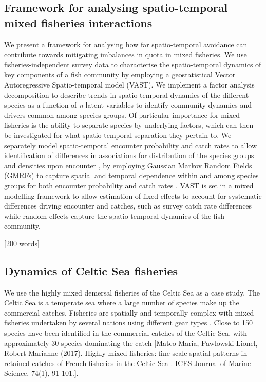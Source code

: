 \documentclass{nature}
\begin{document}
\begin{linenumbers}
[580 words]

\subsection{Framework for analysing spatio-temporal mixed fisheries
	interactions}

We present a framework for analysing how far spatio-temporal avoidance can contribute
towards mitigating imbalances in quota in mixed fisheries. We use fisheries-independent survey data to characterise the spatio-temporal dynamics of key
components of a fish community by employing a geostatistical Vector
Autoregressive Spatio-temporal model (VAST). We implement a factor analysis
decomposition to describe trends in spatio-temporal dynamics of the different
species as a function of \textit{n} latent variables \cite{Thorson2015} to
identify community dynamics and drivers common among species groups. Of particular importance for mixed fisheries is the ability to separate species by underlying factors, which can then be investigated for what spatio-temporal separation they pertain to. We separately model spatio-temporal encounter probability and catch rates to allow
identification of differences in associations for distribution of the species
groups and densities upon encounter \cite{Thorson2015a}, by employing 
Gaussian Markov Random Fields (GMRFs) to capture spatial and temporal
dependence within and among species groups for both encounter probability and
catch rates \cite{Thorson2013}. VAST is set in a mixed modelling framework
to allow estimation of fixed effects to account for systematic differences
driving encounter and catches, such as survey catch rate differences while
random effects capture the spatio-temporal dynamics of the fish community.

[200 words]

\subsection{Dynamics of Celtic Sea fisheries}

We use the highly mixed demersal fisheries of the Celtic Sea as a case study. The Celtic Sea is a
temperate sea where a large number of species make up the commercial catches.
Fisheries are spatially and temporally complex with mixed fisheries undertaken
by several nations using different gear types \cite{Ellis2000, Gerritsen2012}. Close to 150 species have been identified in the 
  commercial catches of the Celtic Sea, with approximately 30 species dominating the catch [Mateo Maria, Pawlowski Lionel, Robert Marianne (2017). Highly mixed fisheries: fine-scale spatial patterns in retained catches of French fisheries in the Celtic Sea . ICES Journal of Marine Science, 74(1), 91-101.].


\end{linenumbers}
\end{document}
